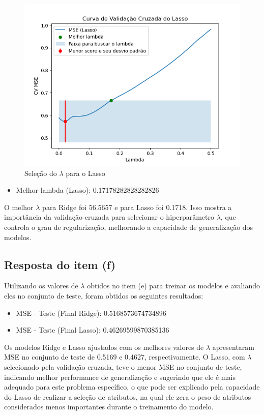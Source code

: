 \begin{figure}[H]
    \centering
    \caption{Seleção do $\lambda$ para o Lasso}
    \includegraphics[width=12cm]{lasso.png}
\end{figure}

\begin{itemize}
    \item Melhor lambda (Lasso): 0.17178282828282826
\end{itemize}

O melhor $\lambda$ para Ridge foi 56.5657 e para Lasso foi 0.1718. Isso mostra a importância da validação cruzada para selecionar o hiperparâmetro $\lambda$, que controla o grau de regularização, melhorando a capacidade de generalização dos modelos.

\subsection{Resposta do item (f)}
Utilizando os valores de $\lambda$ obtidos no item (e) para treinar os modelos e avaliando eles no conjunto de teste, foram obtidos os seguintes resultados:

\begin{itemize}
    \item MSE - Teste (Final Ridge): 0.5168573674734896
    \item MSE - Teste (Final Lasso): 0.46269599870385136
\end{itemize}

Os modelos Ridge e Lasso ajustados com os melhores valores de $\lambda$ apresentaram MSE no conjunto de teste de 0.5169 e 0.4627, respectivamente. O Lasso, com $\lambda$ selecionado pela validação cruzada, teve o menor MSE no conjunto de teste, indicando melhor performance de generalização e sugerindo que ele é mais adequado para este problema específico, o que pode ser explicado pela capacidade do Lasso de realizar a seleção de atributos, na qual ele zera o peso de atributos considerados menos importantes durante o treinamento do modelo.

